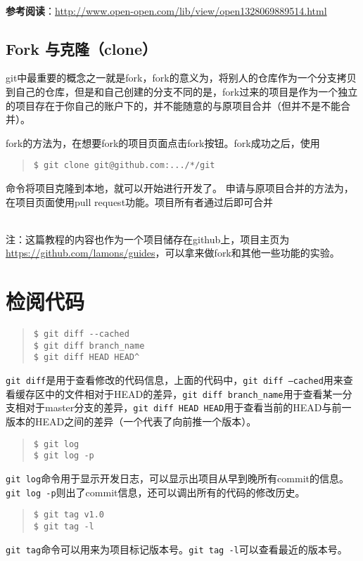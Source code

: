 \documentclass{article}
\begin{document}
			~\\\noindent\textbf{参考阅读}：\url{http://www.open-open.com/lib/view/open1328069889514.html}
		\subsection{Fork 与克隆（clone）} %
		\label{sub:fork_与克隆_clone_}
			git中最重要的概念之一就是fork，fork的意义为，将别人的仓库作为一个分支拷贝到自己的仓库，但是和自己创建的分支不同的是，fork过来的项目是作为一个独立的项目存在于你自己的账户下的，并不能随意的与原项目合并（但并不是不能合并）。
			\par fork的方法为，在想要fork的项目页面点击fork按钮。fork成功之后，使用
			\begin{quote}
				\begin{lstlisting}
$ git clone git@github.com:.../*/git
				\end{lstlisting}
			\end{quote}
			命令将项目克隆到本地，就可以开始进行开发了。
			申请与原项目合并的方法为，在项目页面使用pull request功能。项目所有者通过后即可合并

			~\\注：这篇教程的内容也作为一个项目储存在github上，项目主页为\url{https://github.com/lamons/guides}，可以拿来做fork和其他一些功能的实验。
	\section{检阅代码} %
	\label{sec:检阅代码}
		\begin{quote}
			\begin{lstlisting}
$ git diff --cached
$ git diff branch_name
$ git diff HEAD HEAD^
			\end{lstlisting}
		\end{quote}
		\par{\tt git diff}是用于查看修改的代码信息，上面的代码中，{\tt git diff --cached}用来查看缓存区中的文件相对于HEAD的差异，{\tt git diff branch\_name}用于查看某一分支相对于master分支的差异，{\tt git diff HEAD HEAD$\hat{}$}用于查看当前的HEAD与前一版本的HEAD之间的差异（一个$\hat{}$代表了向前推一个版本）。
		\begin{quote}
			\begin{lstlisting}
$ git log
$ git log -p
			\end{lstlisting}
		\end{quote}
		\par{\tt git log}命令用于显示开发日志，可以显示出项目从早到晚所有commit的信息。{\tt git log -p}则出了commit信息，还可以调出所有的代码的修改历史。
		\begin{quote}
			\begin{lstlisting}
$ git tag v1.0
$ git tag -l
			\end{lstlisting}
		\end{quote}
		{\tt git tag}命令可以用来为项目标记版本号。{\tt git tag -l}可以查看最近的版本号。
\end{document}
